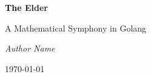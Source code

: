 \documentclass[11pt,twoside,openright]{book}
\begin{document}
\frontmatter

\begin{titlepage}
    \centering
    \vspace*{2cm}
    {\Huge\bfseries \textrm{\textcolor{black}{The }}\textcolor{DarkSkyBlue}{Elder}\par}
    \vspace{2cm}
    {\Large A Mathematical Symphony in Golang\par}
    \vspace{4cm}
    {\Large\itshape Author Name\par}
    \vfill
    {\large \today\par}
\end{titlepage}

\tableofcontents
\listoffigures
\listoftables
\listofalgorithms
\listoftheorems

\mainmatter



\backmatter

\printbibliography[title=References]

\printindex
\end{document}

